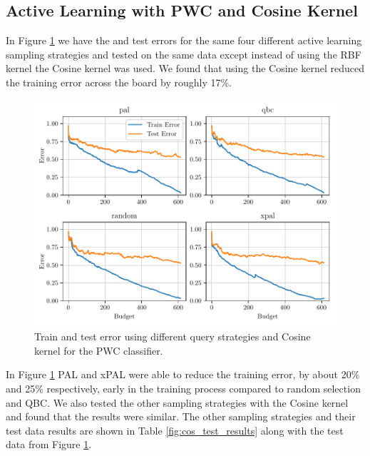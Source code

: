 \subsection{Active Learning with PWC and Cosine Kernel}

In Figure \ref{fig:plot_all_results_cosine} we have the and test errors for the same four different active learning sampling strategies and tested on the same data except instead of using the RBF kernel the Cosine kernel was used. We found that using the Cosine kernel reduced the training error across the board by roughly 17\%.  

\begin{figure}[ht]
  \centering
  \includegraphics[width=\textwidth]{../img/plot_all_results_cosine.pdf}
  \caption{Train and test error using different query strategies and Cosine kernel for the PWC classifier.}
  \label{fig:plot_all_results_cosine}
\end{figure}


In Figure \ref{fig:plot_all_results_cosine} PAL and xPAL were able to reduce the training error, by about 20\% and 25\% respectively, early in the training process compared to random selection and QBC. We also tested the other sampling strategies with the Cosine kernel and found that the results were similar. The other sampling strategies and their test data results are shown in Table \ref{fig:cos_test_results} along with the test data from Figure \ref{fig:plot_all_results_cosine}. 

